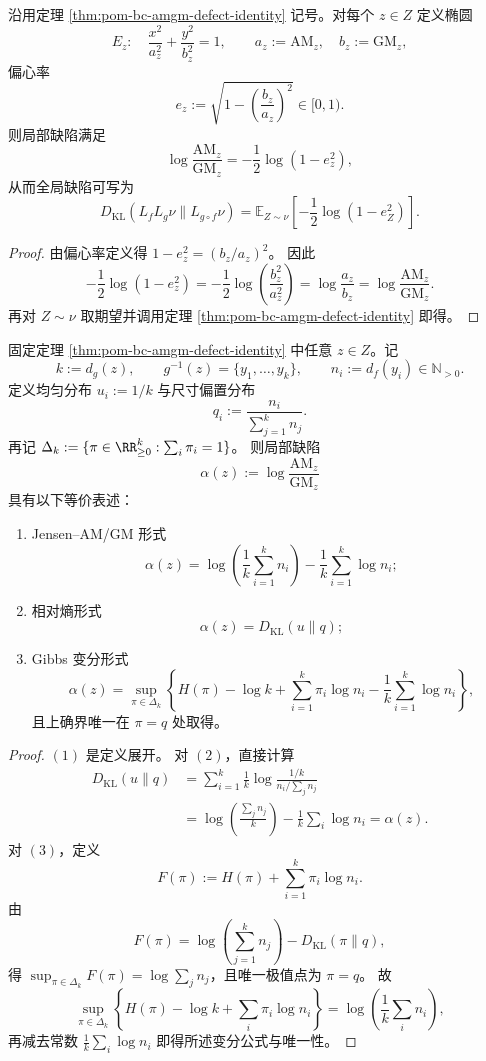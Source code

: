 \begin{proposition}\label{prop:pom-defect-eccentricity-energy}
沿用定理 \ref{thm:pom-bc-amgm-defect-identity} 记号。对每个 \(z\in Z\) 定义椭圆
\[
E_z:\quad \frac{x^2}{a_z^2}+\frac{y^2}{b_z^2}=1,
\qquad
a_z:=\mathrm{AM}_z,\quad b_z:=\mathrm{GM}_z,
\]
偏心率
\[
e_z:=\sqrt{1-\left(\frac{b_z}{a_z}\right)^2}\in[0,1).
\]
则局部缺陷满足
\[
\log\frac{\mathrm{AM}_z}{\mathrm{GM}_z}
=-\frac12\log(1-e_z^2),
\]
从而全局缺陷可写为
\[
\boxed{\;
D_{\mathrm{KL}}(L_fL_g\nu\|L_{g\circ f}\nu)
=\mathbb E_{Z\sim\nu}\!\left[-\frac12\log(1-e_Z^2)\right].
\;}
\]
\end{proposition}
\begin{proof}
由偏心率定义得
\(
1-e_z^2=(b_z/a_z)^2
\)。
因此
\[
-\frac12\log(1-e_z^2)
=-\frac12\log\!\left(\frac{b_z^2}{a_z^2}\right)
=\log\frac{a_z}{b_z}
=\log\frac{\mathrm{AM}_z}{\mathrm{GM}_z}.
\]
再对 \(Z\sim\nu\) 取期望并调用定理 \ref{thm:pom-bc-amgm-defect-identity} 即得。
\end{proof}

\begin{theorem}\label{thm:pom-local-defect-gibbs-variational}
固定定理 \ref{thm:pom-bc-amgm-defect-identity} 中任意 \(z\in Z\)。记
\[
k:=d_g(z),\qquad g^{-1}(z)=\{y_1,\dots,y_k\},\qquad
n_i:=d_f(y_i)\in\mathbb N_{>0}.
\]
定义均匀分布 \(u_i:=1/k\) 与尺寸偏置分布
\[
q_i:=\frac{n_i}{\sum_{j=1}^{k}n_j}.
\]
再记 \(\Delta_k:=\{\pi\in\RR_{\ge0}^{k}:\sum_i\pi_i=1\}\)。
则局部缺陷
\[
\alpha(z):=\log\frac{\mathrm{AM}_z}{\mathrm{GM}_z}
\]
具有以下等价表述：
\begin{enumerate}
  \item Jensen--AM/GM 形式
  \[
  \alpha(z)
  =\log\!\left(\frac1k\sum_{i=1}^{k}n_i\right)-\frac1k\sum_{i=1}^{k}\log n_i;
  \]
  \item 相对熵形式
  \[
  \alpha(z)=D_{\mathrm{KL}}(u\|q);
  \]
  \item Gibbs 变分形式
  \[
  \alpha(z)
  =\sup_{\pi\in\Delta_k}\left\{
  H(\pi)-\log k+\sum_{i=1}^{k}\pi_i\log n_i-\frac1k\sum_{i=1}^{k}\log n_i
  \right\},
  \]
  且上确界唯一在 \(\pi=q\) 处取得。
\end{enumerate}
\end{theorem}
\begin{proof}
\((1)\) 是定义展开。
对 \((2)\)，直接计算
\[
\begin{aligned}
D_{\mathrm{KL}}(u\|q)
&=\sum_{i=1}^{k}\frac1k\log\frac{1/k}{n_i/\sum_j n_j}\\
&=\log\!\left(\frac{\sum_j n_j}{k}\right)-\frac1k\sum_i\log n_i
=\alpha(z).
\end{aligned}
\]
对 \((3)\)，定义
\[
F(\pi):=H(\pi)+\sum_{i=1}^{k}\pi_i\log n_i.
\]
由
\[
F(\pi)=\log\!\left(\sum_{j=1}^{k}n_j\right)-D_{\mathrm{KL}}(\pi\|q),
\]
得 \(\sup_{\pi\in\Delta_k}F(\pi)=\log\sum_j n_j\)，且唯一极值点为 \(\pi=q\)。
故
\[
\sup_{\pi\in\Delta_k}\left\{H(\pi)-\log k+\sum_i\pi_i\log n_i\right\}
=\log\!\left(\frac1k\sum_i n_i\right),
\]
再减去常数 \(\frac1k\sum_i\log n_i\) 即得所述变分公式与唯一性。
\end{proof}


